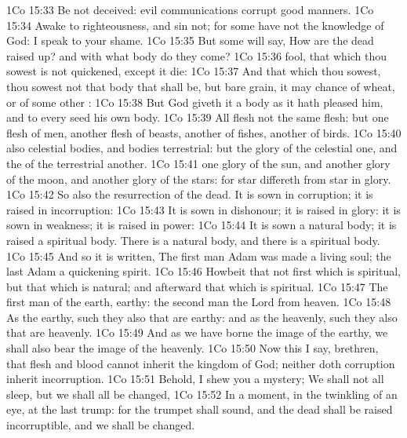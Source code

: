 \vs 1Co 15:33 Be not deceived: evil communications corrupt good manners.
\vs 1Co 15:34 Awake to righteousness, and sin not; for some have not the knowledge of God: I speak  to your shame.
\vs 1Co 15:35 But some  will say, How are the dead raised up? and with what body do they come?
\vs 1Co 15:36  fool, that which thou sowest is not quickened, except it die:
\vs 1Co 15:37 And that which thou sowest, thou sowest not that body that shall be, but bare grain, it may chance of wheat, or of some other :
\vs 1Co 15:38 But God giveth it a body as it hath pleased him, and to every seed his own body.
\vs 1Co 15:39 All flesh  not the same flesh: but  one  flesh of men, another flesh of beasts, another of fishes,  another of birds.
\vs 1Co 15:40  also celestial bodies, and bodies terrestrial: but the glory of the celestial  one, and the  of the terrestrial  another.
\vs 1Co 15:41  one glory of the sun, and another glory of the moon, and another glory of the stars: for  star differeth from  star in glory.
\vs 1Co 15:42 So also  the resurrection of the dead. It is sown in corruption; it is raised in incorruption:
\vs 1Co 15:43 It is sown in dishonour; it is raised in glory: it is sown in weakness; it is raised in power:
\vs 1Co 15:44 It is sown a natural body; it is raised a spiritual body. There is a natural body, and there is a spiritual body.
\vs 1Co 15:45 And so it is written, The first man Adam was made a living soul; the last Adam  a quickening spirit.
\vs 1Co 15:46 Howbeit that  not first which is spiritual, but that which is natural; and afterward that which is spiritual.
\vs 1Co 15:47 The first man  of the earth, earthy: the second man  the Lord from heaven.
\vs 1Co 15:48 As  the earthy, such  they also that are earthy: and as  the heavenly, such  they also that are heavenly.
\vs 1Co 15:49 And as we have borne the image of the earthy, we shall also bear the image of the heavenly.
\vs 1Co 15:50 Now this I say, brethren, that flesh and blood cannot inherit the kingdom of God; neither doth corruption inherit incorruption.
\vs 1Co 15:51 Behold, I shew you a mystery; We shall not all sleep, but we shall all be changed,
\vs 1Co 15:52 In a moment, in the twinkling of an eye, at the last trump: for the trumpet shall sound, and the dead shall be raised incorruptible, and we shall be changed.
